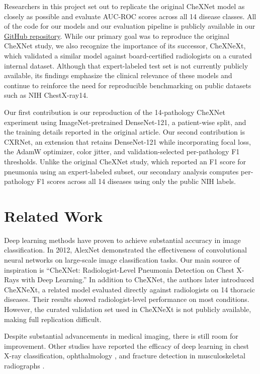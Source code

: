 Researchers in this project set out to replicate the original CheXNet model as closely
as possible and evaluate AUC-ROC scores across all 14 disease classes. All of the code
for our models and our evaluation pipeline is publicly available in our
\href{https://github.com/dstrick17/CXRNet}{GitHub repository}. While our
primary goal was to reproduce the original CheXNet study, we also recognize the
importance of its successor, CheXNeXt, which validated a similar model against
board-certified radiologists on a curated internal dataset\cite{rajpurkar2018}.
Although that expert-labeled test set is not currently publicly available, its findings
emphasize the clinical relevance of these models and continue to reinforce the need for
reproducible benchmarking on public datasets such as NIH ChestX-ray14.

Our first contribution is our reproduction of the 14-pathology CheXNet
experiment using ImageNet-pretrained DenseNet-121, a patient-wise split, and
the training details reported in the original article. Our second contribution
is CXRNet, an extension that retains DenseNet-121 while incorporating focal
loss, the AdamW optimizer, color jitter, and validation-selected per-pathology
F1 thresholds. Unlike the original CheXNet study, which reported an F1 score
for pneumonia using an expert-labeled subset, our secondary analysis computes
per-pathology F1 scores across all 14 diseases using only the public NIH labels.

\section{Related Work}

Deep learning methods have proven to achieve substantial accuracy in image
classification. In 2012, AlexNet demonstrated the effectiveness of
convolutional neural networks on large-scale image classification
tasks\cite{krizhevsky2012}. Our main source of inspiration is ``CheXNet:
Radiologist-Level Pneumonia Detection on Chest X-Rays with Deep Learning.'' In
addition to CheXNet, the authors later introduced CheXNeXt, a related model
evaluated directly against radiologists on 14 thoracic diseases. Their results
showed radiologist-level performance on most conditions. However, the curated
validation set used in CheXNeXt is not publicly available, making full
replication difficult.

Despite substantial advancements in medical imaging, there is still room for
improvement\cite{shen2017}. Other studies have reported the efficacy of deep
learning in chest X-ray classification\cite{kufel2023}, ophthalmology
\cite{kermany2018}, and fracture detection in musculoskeletal radiographs
\cite{jones2020}.


